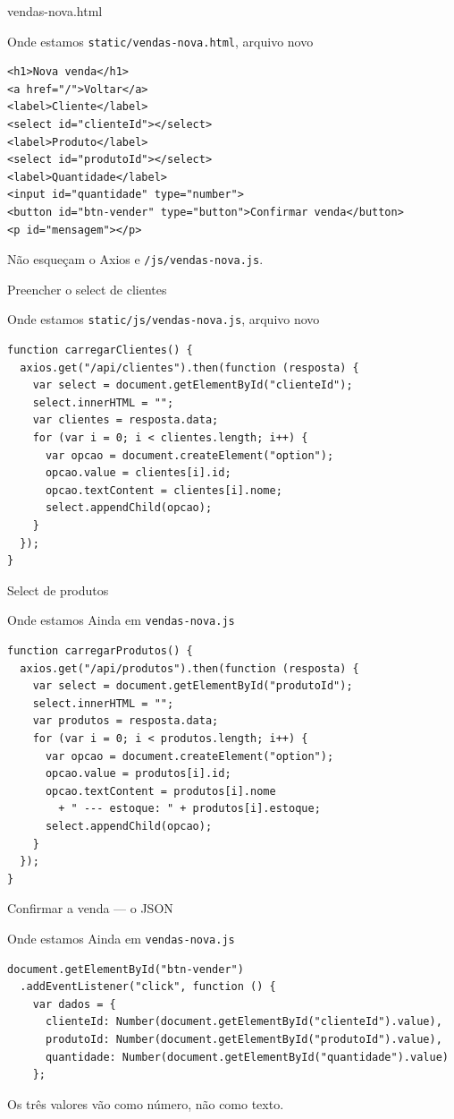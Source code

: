 \documentclass[aspectratio=169,11pt]{beamer}
\newcommand{\onde}[1]{%
  \begin{block}{Onde estamos}
    #1
  \end{block}
}
\begin{document}
\begin{frame}[fragile]{vendas-nova.html}
  \onde{\texttt{static/vendas-nova.html}, arquivo novo}

\begin{lstlisting}[basicstyle=\ttfamily\scriptsize]
<h1>Nova venda</h1>
<a href="/">Voltar</a>
<label>Cliente</label>
<select id="clienteId"></select>
<label>Produto</label>
<select id="produtoId"></select>
<label>Quantidade</label>
<input id="quantidade" type="number">
<button id="btn-vender" type="button">Confirmar venda</button>
<p id="mensagem"></p>
\end{lstlisting}

  Não esqueçam o Axios e \texttt{/js/vendas-nova.js}.
\end{frame}

\begin{frame}[fragile]{Preencher o select de clientes}
  \onde{\texttt{static/js/vendas-nova.js}, arquivo novo}

\begin{lstlisting}[basicstyle=\ttfamily\scriptsize]
function carregarClientes() {
  axios.get("/api/clientes").then(function (resposta) {
    var select = document.getElementById("clienteId");
    select.innerHTML = "";
    var clientes = resposta.data;
    for (var i = 0; i < clientes.length; i++) {
      var opcao = document.createElement("option");
      opcao.value = clientes[i].id;
      opcao.textContent = clientes[i].nome;
      select.appendChild(opcao);
    }
  });
}
\end{lstlisting}
\end{frame}

\begin{frame}[fragile]{Select de produtos}
  \onde{Ainda em \texttt{vendas-nova.js}}

\begin{lstlisting}[basicstyle=\ttfamily\scriptsize]
function carregarProdutos() {
  axios.get("/api/produtos").then(function (resposta) {
    var select = document.getElementById("produtoId");
    select.innerHTML = "";
    var produtos = resposta.data;
    for (var i = 0; i < produtos.length; i++) {
      var opcao = document.createElement("option");
      opcao.value = produtos[i].id;
      opcao.textContent = produtos[i].nome
        + " --- estoque: " + produtos[i].estoque;
      select.appendChild(opcao);
    }
  });
}
\end{lstlisting}
\end{frame}

\begin{frame}[fragile]{Confirmar a venda --- o JSON}
  \onde{Ainda em \texttt{vendas-nova.js}}

\begin{lstlisting}[basicstyle=\ttfamily\scriptsize]
document.getElementById("btn-vender")
  .addEventListener("click", function () {
    var dados = {
      clienteId: Number(document.getElementById("clienteId").value),
      produtoId: Number(document.getElementById("produtoId").value),
      quantidade: Number(document.getElementById("quantidade").value)
    };
\end{lstlisting}

  Os três valores vão como número, não como texto.
\end{frame}
\end{document}
